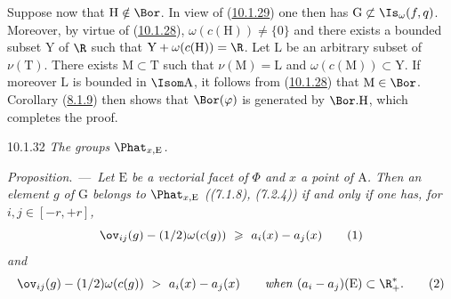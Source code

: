 \documentclass[12pt,a4paper,oneside,english]{smfart}
\makeatletter
\newcommand{\btanchor}[1]{\leavevmode\Hy@raisedlink{\hypertarget{bt:#1}{}}}
\newcommand{\btref}[1]{\hyperlink{bt:#1}{#1}}
\newcommand{\btunnum}[1]{\par\medskip\noindent\emph{#1}.\ ---\ \ignorespaces}
\theoremstyle{definition}
\theoremstyle{bt}
\makeatother
\begin{document}
Suppose now that $\mathrm{H}\notin\Bor$. In view of (\btref{10.1.29}) one then has
$\mathrm{G}\not\subset \Is_\omega(f,q)$. Moreover, by virtue of (\btref{10.1.28}),
$\omega(c(\mathrm{H}))\neq\{0\}$ and there exists a bounded subset $\mathrm{Y}$
of $\R$ such that $\mathrm{Y}+\omega(c(\mathrm{H}))=\R$. Let $\mathrm{L}$ be an
arbitrary subset of $\nu(\mathrm{T})$. There exists $\mathrm{M}\subset
\mathrm{T}$ such that $\nu(\mathrm{M})=\mathrm{L}$ and
$\omega(c(\mathrm{M}))\subset \mathrm{Y}$. If moreover $\mathrm{L}$ is bounded
in $\Isom \mathrm{A}$, it follows from (\btref{10.1.28}) that $\mathrm{M}\in\Bor$.
Corollary (\btref{8.1.9}) then shows that $\Bor(\varphi)$ is generated by
$\Bor.\mathrm{H}$, which completes the proof.

\num{10.1.32}\btanchor{10.1.32} \emph{The groups $\Phat_{x,\mathrm{E}}$.}

\btunnum{Proposition}\emph{Let $\mathrm{E}$ be a vectorial facet of
$\Phi$ and $x$ a point of $\mathrm{A}$. Then an element $g$ of $\mathrm{G}$
belongs to $\Phat_{x,\mathrm{E}}$ ((7.1.8), (7.2.4)) if and only if one has, for
$i,j\in[-r,+r]$,}
\begin{equation*}
\ov_{ij}(g)-(1/2)\omega(c(g))\ \geqslant\ a_i(x)-a_j(x)
\tag{1}
\end{equation*}
\emph{and}
\begin{equation*}
\ov_{ij}(g)-(1/2)\omega(c(g))\ >\ a_i(x)-a_j(x)
\qquad\text{\emph{when} } (a_i-a_j)(\mathrm{E})\subset\R^{*}_{+}.
\tag{2}
\end{equation*}
\end{document}
